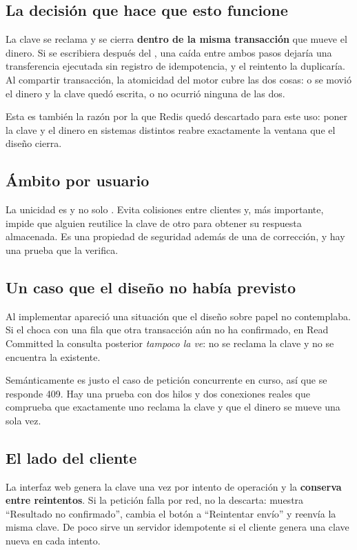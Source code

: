 \subsection{La decisión que hace que esto funcione}

La clave se reclama y se cierra \textbf{dentro de la misma transacción} que
mueve el dinero. Si se escribiera después del , una caída entre
ambos pasos dejaría una transferencia ejecutada sin registro de idempotencia,
y el reintento la duplicaría. Al compartir transacción, la atomicidad del
motor cubre las dos cosas: o se movió el dinero y la clave quedó escrita, o no
ocurrió ninguna de las dos.

Esta es también la razón por la que Redis quedó descartado para este uso:
poner la clave y el dinero en sistemas distintos reabre exactamente la ventana
que el diseño cierra.

\subsection{Ámbito por usuario}

La unicidad es  y no solo . Evita
colisiones entre clientes y, más importante, impide que alguien reutilice la
clave de otro para obtener su respuesta almacenada. Es una propiedad de
seguridad además de una de corrección, y hay una prueba que la verifica.

\subsection{Un caso que el diseño no había previsto}

Al implementar apareció una situación que el diseño sobre papel no
contemplaba. Si el  choca con una fila que otra transacción aún
no ha confirmado, en Read Committed la consulta posterior \emph{tampoco la
ve}: no se reclama la clave y no se encuentra la existente.

Semánticamente es justo el caso de petición concurrente en curso, así que se
responde 409. Hay una prueba con dos hilos y dos conexiones reales que
comprueba que exactamente uno reclama la clave y que el dinero se mueve una
sola vez. 

\subsection{El lado del cliente}

La interfaz web genera la clave una vez por intento de operación y la
\textbf{conserva entre reintentos}. Si la petición falla por red, no la
descarta: muestra \enquote{Resultado no confirmado}, cambia el botón a
\enquote{Reintentar envío} y reenvía la misma clave. De poco sirve un servidor
idempotente si el cliente genera una clave nueva en cada intento.
